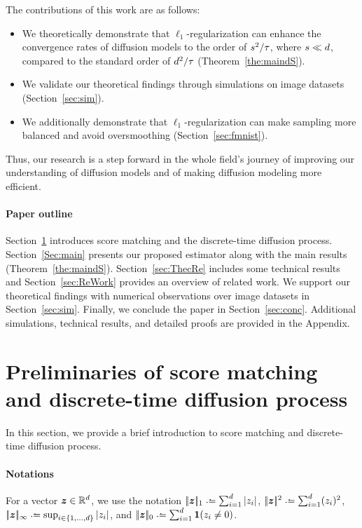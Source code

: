 The contributions of this work are as follows:  
\begin{itemize}  
    \item We theoretically demonstrate that $\ell_1$-regularization can enhance the convergence rates of diffusion models to  the order of $s^2/\textcolor{black}{\tau}$, where $s \ll \textcolor{black}{d}$, compared to the standard order of $\textcolor{black}{d}^2/\textcolor{black}{\tau}$ (Theorem~\ref{the:maindS}).
    \item We validate our theoretical findings through  simulations on image datasets (Section~\ref{sec:sim}).   
    \item We additionally demonstrate that $\ell_1$-regularization can make sampling more balanced and avoid oversmoothing (Section~\ref{sec:fmnist}).
\end{itemize}
\noindent 
Thus, our research is a step forward in the whole field's journey of improving our understanding of  diffusion models and of making diffusion modeling more efficient.

\paragraph{Paper outline}
Section~\ref{sec:disc-setting} introduces score matching and the discrete-time diffusion process.
Section~\ref{Sec:main} presents our proposed estimator along with the main results (Theorem~\ref{the:maindS}).
Section~\ref{sec:ThecRe} includes some technical results and Section~\ref{sec:ReWork} provides an overview of related work.
We support our theoretical findings with numerical observations over image datasets in Section~\ref{sec:sim}.
Finally, we conclude the paper in Section~\ref{sec:conc}.
Additional simulations, technical results, and detailed proofs are provided in the Appendix.


\section{Preliminaries of score matching and discrete-time diffusion process}\label{sec:disc-setting}
In this section, we provide a brief introduction to score matching and  discrete-time diffusion process.
\paragraph{Notations}\label{Notations}
    For a vector $\boldsymbol{z}\in \textcolor{black}{\mathbb{R}}^{\textcolor{black}{d}}$, we use the notation $\norm{\boldsymbol{z}}_1\deq \sum_{i=1}^{\Dim} |z_i|$, $\norm{\boldsymbol{z}}^2\deq \sum_{i=1}^{\Dim} (z_i)^2$, $\norm{\boldsymbol{z}}_{\infty}\deq \sup_{i\in \{1,\dots,\Dim\}} |z_i|$, and $\norm{\boldsymbol{z}}_0\deq\sum_{i=1}^{\Dim} \mathbf{1}(z_i \neq 0)$. 
   

